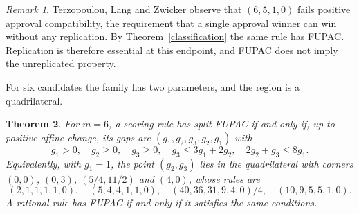 \documentclass[11pt,a4paper]{article}
\newtheorem{theorem}{Theorem}
\theoremstyle{definition}
\theoremstyle{remark}
\newtheorem{remark}[theorem]{Remark}
\begin{document}
\begin{remark}
Terzopoulou, Lang and Zwicker \cite[note~7]{tlz} observe that $(6,5,1,0)$ fails positive approval compatibility, the requirement that a single approval winner can win without any replication. By Theorem~\ref{classification} the same rule has FUPAC. Replication is therefore essential at this endpoint, and FUPAC does not imply the unreplicated property.
\end{remark}

For six candidates the family has two parameters, and the region is a quadrilateral.

\begin{theorem}\label{six}
For $m=6$, a scoring rule has split FUPAC if and only if, up to positive affine change, its gaps are $(g_1,g_2,g_3,g_2,g_1)$ with
\[
 g_1>0,\quad g_2\ge0,\quad g_3\ge0,\quad g_3\le3g_1+2g_2,\quad 2g_2+g_3\le8g_1 .
\]
Equivalently, with $g_1=1$, the point $(g_2,g_3)$ lies in the quadrilateral with corners $(0,0)$, $(0,3)$, $(5/4,11/2)$ and $(4,0)$, whose rules are
\[
 (2,1,1,1,1,0),\quad(5,4,4,1,1,0),\quad(40,36,31,9,4,0)/4,\quad(10,9,5,5,1,0).
\]
A rational rule has FUPAC if and only if it satisfies the same conditions.
\end{theorem}
\end{document}
